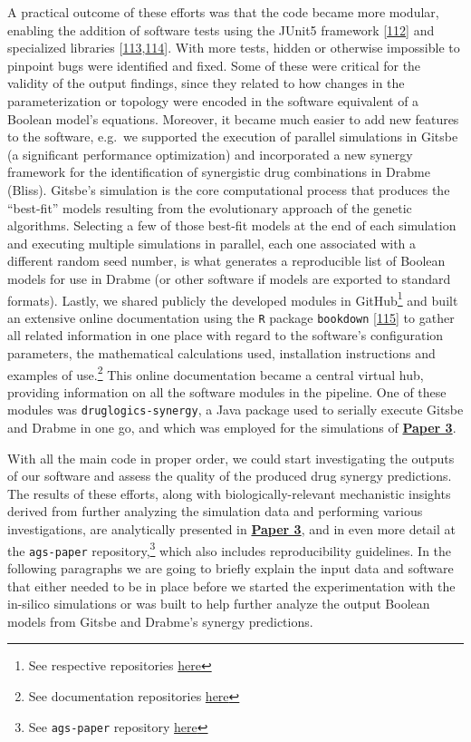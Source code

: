 \documentclass[
  12pt,
]{book}
\begin{document}
A practical outcome of these efforts was that the code became more modular, enabling the addition of software tests using the JUnit5 framework {[}\protect\hyperlink{ref-JUnit5}{112}{]} and specialized libraries {[}\protect\hyperlink{ref-AssertJ}{113},\protect\hyperlink{ref-Mockito-site}{114}{]}.
With more tests, hidden or otherwise impossible to pinpoint bugs were identified and fixed.
Some of these were critical for the validity of the output findings, since they related to how changes in the parameterization or topology were encoded in the software equivalent of a Boolean model's equations.
Moreover, it became much easier to add new features to the software, e.g.~we supported the execution of parallel simulations in Gitsbe (a significant performance optimization) and incorporated a new synergy framework for the identification of synergistic drug combinations in Drabme (Bliss).
Gitsbe's simulation is the core computational process that produces the ``best-fit'' models resulting from the evolutionary approach of the genetic algorithms.
Selecting a few of those best-fit models at the end of each simulation and executing multiple simulations in parallel, each one associated with a different random seed number, is what generates a reproducible list of Boolean models for use in Drabme (or other software if models are exported to standard formats).
Lastly, we shared publicly the developed modules in GitHub\footnote{See respective repositories \protect\hyperlink{druglogics-soft-links}{here}} and built an extensive online documentation using the \texttt{R} package \texttt{bookdown} {[}\protect\hyperlink{ref-Xie2016}{115}{]} to gather all related information in one place with regard to the software's configuration parameters, the mathematical calculations used, installation instructions and examples of use.\footnote{See documentation repositories \protect\hyperlink{doc-links}{here}}
This online documentation became a central virtual hub, providing information on all the software modules in the pipeline.
One of these modules was \texttt{druglogics-synergy}, a Java package used to serially execute Gitsbe and Drabme in one go, and which was employed for the simulations of \textbf{\protect\hyperlink{Paper3}{Paper 3}}.

With all the main code in proper order, we could start investigating the outputs of our software and assess the quality of the produced drug synergy predictions.
The results of these efforts, along with biologically-relevant mechanistic insights derived from further analyzing the simulation data and performing various investigations, are analytically presented in \textbf{\protect\hyperlink{Paper3}{Paper 3}}, and in even more detail at the \texttt{ags-paper} repository,\footnote{See \texttt{ags-paper} repository \protect\hyperlink{misc-links}{here}} which also includes reproducibility guidelines.
In the following paragraphs we are going to briefly explain the input data and software that either needed to be in place before we started the experimentation with the in-silico simulations or was built to help further analyze the output Boolean models from Gitsbe and Drabme's synergy predictions.
\end{document}
